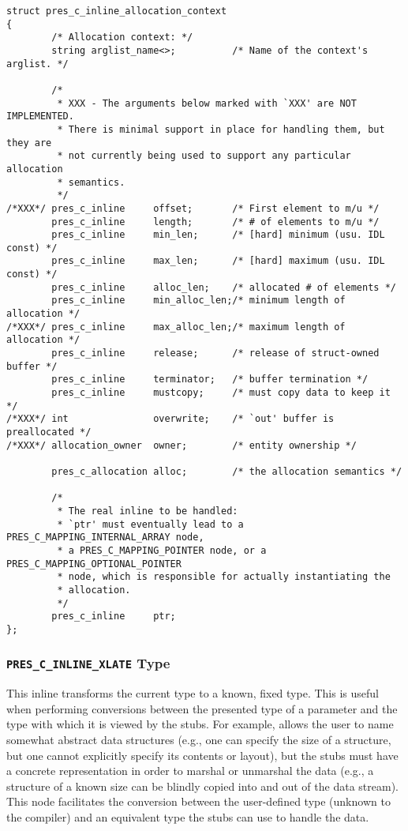 \begin{verbatim}
struct pres_c_inline_allocation_context
{
        /* Allocation context: */
        string arglist_name<>;          /* Name of the context's arglist. */
        
        /*
         * XXX - The arguments below marked with `XXX' are NOT IMPLEMENTED.
         * There is minimal support in place for handling them, but they are
         * not currently being used to support any particular allocation
         * semantics.
         */
/*XXX*/ pres_c_inline     offset;       /* First element to m/u */
        pres_c_inline     length;       /* # of elements to m/u */
        pres_c_inline     min_len;      /* [hard] minimum (usu. IDL const) */
        pres_c_inline     max_len;      /* [hard] maximum (usu. IDL const) */
        pres_c_inline     alloc_len;    /* allocated # of elements */
        pres_c_inline     min_alloc_len;/* minimum length of allocation */
/*XXX*/ pres_c_inline     max_alloc_len;/* maximum length of allocation */
        pres_c_inline     release;      /* release of struct-owned buffer */
        pres_c_inline     terminator;   /* buffer termination */
        pres_c_inline     mustcopy;     /* must copy data to keep it */
/*XXX*/ int               overwrite;    /* `out' buffer is preallocated */
/*XXX*/ allocation_owner  owner;        /* entity ownership */

        pres_c_allocation alloc;        /* the allocation semantics */
        
        /*
         * The real inline to be handled:
         * `ptr' must eventually lead to a PRES_C_MAPPING_INTERNAL_ARRAY node,
         * a PRES_C_MAPPING_POINTER node, or a PRES_C_MAPPING_OPTIONAL_POINTER
         * node, which is responsible for actually instantiating the
         * allocation.
         */
        pres_c_inline     ptr;
};
\end{verbatim}

\subsubsection{\texttt{PRES\_C\_INLINE\_XLATE} Type}

This inline transforms the current \CAST{} type to a known, fixed type.  This
is useful when performing conversions between the presented type of a parameter
and the type with which it is viewed by the stubs.  For example, \MIG{} allows
the user to name somewhat abstract data structures (e.g., one can specify the
size of a structure, but one cannot explicitly specify its contents or layout),
but the stubs must have a concrete representation in order to marshal or
unmarshal the data (e.g., a structure of a known size can be blindly copied
into and out of the data stream).  This node facilitates the conversion between
the user-defined type (unknown to the \IDL{} compiler) and an equivalent type
the stubs can use to handle the data.

